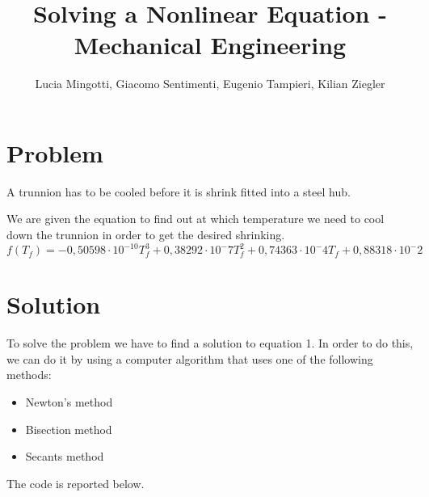 \documentclass[a4paper,12pt]{article}
\title{Solving a Nonlinear Equation - Mechanical Engineering}
\author{Lucia Mingotti, Giacomo Sentimenti, Eugenio Tampieri, Kilian Ziegler}
\begin{document}
\maketitle
\section{Problem}
    \par A trunnion has to be cooled before it is shrink fitted into a steel hub.
    \par We are given the equation to find out at which temperature we need to cool down the trunnion in order to get the desired shrinking.
    \begin{equation}
        f(T_f) = -0,50598\cdot 10^{-10}T_f^3 + 0,38292 \cdot 10^-7T_f^2+0,74363\cdot 10^-4 T_f + 0,88318\cdot 10^-2
    \end{equation}
\section{Solution}
    \par To solve the problem we have to find a solution to equation 1. In order to do this, we can do it by using a computer algorithm that uses one of the following methods:
    \begin{itemize}
        \item Newton's method
        \item Bisection method
        \item Secants method
    \end{itemize}
    The code is reported below.
    
\end{document}
